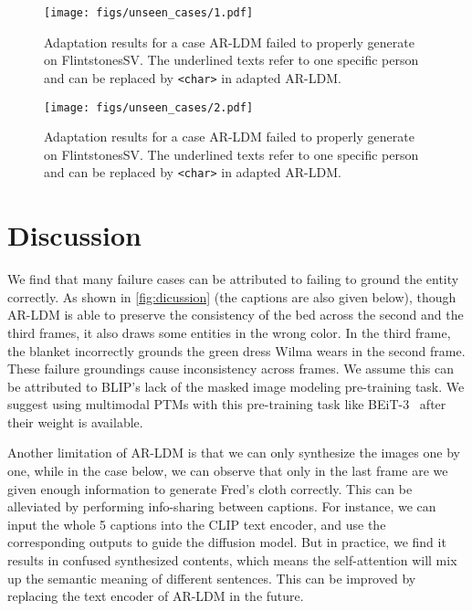\documentclass[10pt,twocolumn,letterpaper]{article}
\begin{document}
\begin{figure}[!th]
\centering
\texttt{[image: figs/unseen\_cases/1.pdf]}
\caption{Adaptation results for a case AR-LDM failed to properly generate on FlintstonesSV. The underlined texts refer to one specific person and can be replaced by \texttt{<char>} in adapted AR-LDM.}
\label{fig:unseen_cases_1}
\end{figure}
\begin{figure}[!th]
\centering
\texttt{[image: figs/unseen\_cases/2.pdf]}
\caption{Adaptation results for a case AR-LDM failed to properly generate on FlintstonesSV. The underlined texts refer to one specific person and can be replaced by \texttt{<char>} in adapted AR-LDM.}
\label{fig:unseen_cases_2}
\end{figure}

\clearpage
\section{Discussion}
\label{sec:additional_discussion}
We find that many failure cases can be attributed to failing to ground the entity correctly. As shown in \cref{fig:dicussion} (the captions are also given below), though AR-LDM is able to preserve the consistency of the bed across the second and the third frames, it also draws some entities in the wrong color. In the third frame, the blanket incorrectly grounds the green dress Wilma wears in the second frame. These failure groundings cause inconsistency across frames. We assume this can be attributed to BLIP's lack of the masked image modeling pre-training task. We suggest using multimodal PTMs with this pre-training task like BEiT-3~\cite{beit3} after their weight is available.

Another limitation of AR-LDM is that we can only synthesize the images one by one, while in the case below, we can observe that only in the last frame are we given enough information to generate Fred's cloth correctly. This can be alleviated by performing info-sharing between captions. For instance, we can input the whole 5 captions into the CLIP text encoder, and use the corresponding outputs to guide the diffusion model. But in practice, we find it results in confused synthesized contents, which means the self-attention will mix up the semantic meaning of different sentences. This can be improved by replacing the text encoder of AR-LDM in the future.
\end{document}
